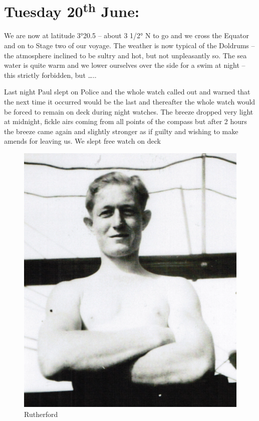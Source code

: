 \documentclass[
  11pt,
  msmallroyalvopaper
]{memoir}
\begin{document}
\hypertarget{tuesday-20th-june}{%
\section{\texorpdfstring{Tuesday 20\textsuperscript{th}
June:}{Tuesday 20th June:}}\label{tuesday-20th-june}}

We are now at latitude 3°20.5 -- about 3 1/2° N to go and we cross the
Equator and on to Stage two of our voyage. The weather is now typical of
the Doldrums -- the atmosphere inclined to be sultry and hot, but not
unpleasantly so. The sea water is quite warm and we lower ourselves over
the side for a swim at night -- this strictly forbidden, but \ldots..

Last night Paul slept on Police and the whole watch called out and
warned that the next time it occurred would be the last and thereafter
the whole watch would be forced to remain on deck during night watches.
The breeze dropped very light at midnight, fickle airs coming from all
points of the compass but after 2 hours the breeze came again and
slightly stronger as if guilty and wishing to make amends for leaving
us. We slept free watch on deck

\begin{figure}
\centering
\includegraphics{./images/image025.png}
\caption{Rutherford}
\end{figure}
\end{document}
